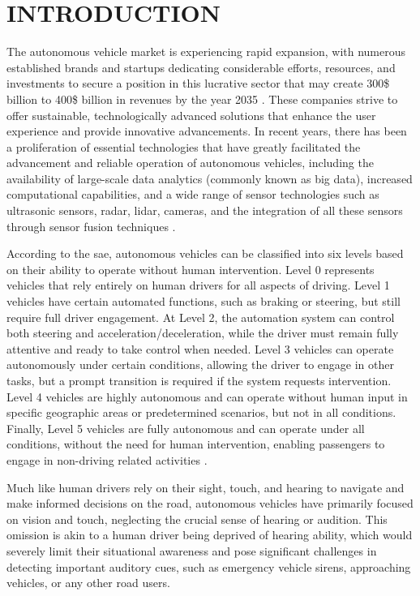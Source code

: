     \chapter{INTRODUCTION}
\label{chp:introduction}

The autonomous vehicle market is experiencing rapid expansion, with numerous established brands and startups dedicating considerable efforts, resources, and investments to secure a position in this lucrative sector that may create 300\$ billion to 400\$ billion in revenues by the year 2035 \cite{McKinsey2023}. These companies strive to offer sustainable, technologically advanced solutions that enhance the user experience and provide innovative advancements. In recent years, there has been a proliferation of essential technologies that have greatly facilitated the advancement and reliable operation of autonomous vehicles, including the availability of large-scale data analytics (commonly known as big data), increased computational capabilities, and a wide range of sensor technologies such as ultrasonic sensors, \gls{radar}, \gls{lidar}, cameras, and the integration of all these sensors through sensor fusion techniques \cite{Hussainj2018}.

According to the \gls{sae}, autonomous vehicles can be classified into six levels based on their ability to operate without human intervention. Level 0 represents vehicles that rely entirely on human drivers for all aspects of driving. Level 1 vehicles have certain automated functions, such as braking or steering, but still require full driver engagement. At Level 2, the automation system can control both steering and acceleration/deceleration, while the driver must remain fully attentive and ready to take control when needed. Level 3 vehicles can operate autonomously under certain conditions, allowing the driver to engage in other tasks, but a prompt transition is required if the system requests intervention. Level 4 vehicles are highly autonomous and can operate without human input in specific geographic areas or predetermined scenarios, but not in all conditions. Finally, Level 5 vehicles are fully autonomous and can operate under all conditions, without the need for human intervention, enabling passengers to engage in non-driving related activities \cite{SAE2021}.

Much like human drivers rely on their sight, touch, and hearing to navigate and make informed decisions on the road, autonomous vehicles have primarily focused on vision and touch, neglecting the crucial sense of hearing or audition. This omission is akin to a human driver being deprived of hearing ability, which would severely limit their situational awareness and pose significant challenges in detecting important auditory cues, such as emergency vehicle sirens, approaching vehicles, or any other road users.

